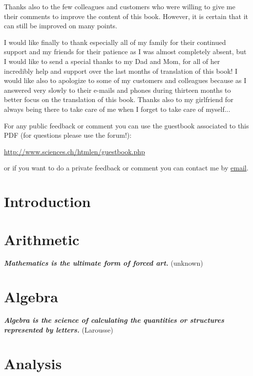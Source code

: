 \documentclass[12pt,a4paper,twoside,openright]{report}
\theoremstyle{definition}
\theoremstyle{itexmp}
\numberwithin{equation}{section}
\begin{document}
	Thanks also to the few colleagues and customers who were willing to give me their comments to improve the content of this book. However, it is certain that it can still be improved on many points.
	
	I would like finally to thank especially all of my family for their continued support and my friends for their patience as I was almost completely absent, but I would like to send a special thanks to my Dad and Mom, for all of her incredibly help and support over the last months of translation of this book! I would like also to apologize to some of my customers and colleagues because as I answered very slowly to their e-mails and phones during thirteen months to better focus on the translation of this book. Thanks also to my girlfriend for always being there to take care of me when I forget to take care of myself...
	
	For any public feedback or comment you can use the guestbook associated to this PDF (for questions please use the forum!):
	\begin{center}
	\url{http://www.sciences.ch/htmlen/guestbook.php}
	\end{center}
	or if you want to do a private feedback or comment you can contact me by {\href{mailto:info@sciences.ch}{{\color{blue}email}}}.
	
\chapter{Introduction}
	
	\minitoc
	\pagebreak
	
	

\chapter{Arithmetic}

	\textit{\textbf{Mathematics is the ultimate form of forced art.}} (unknown)
	\minitoc
	
	
	
\chapter{Algebra}

	\textit{\textbf{Algebra is the science of calculating the quantities or structures represented by letters.}} (Larousse)
	\minitoc
	
	
		
\chapter{Analysis}
\end{document}
